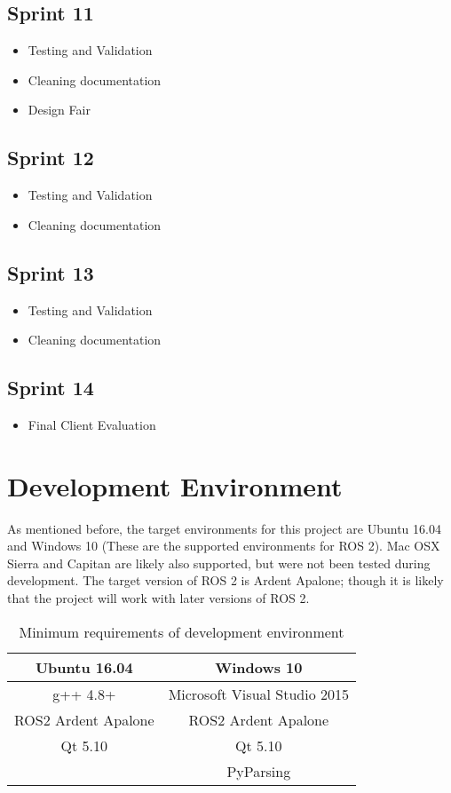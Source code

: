 \subsection{Sprint 11}
\begin{itemize}
	\item Testing and Validation
	\item Cleaning documentation
	\item Design Fair
\end{itemize}

\subsection{Sprint 12}
\begin{itemize}
	\item Testing and Validation
	\item Cleaning documentation
\end{itemize}

\subsection{Sprint 13}
\begin{itemize}
	\item Testing and Validation
	\item Cleaning documentation
\end{itemize}

\subsection{Sprint 14}
\begin{itemize}
	\item Final Client Evaluation
\end{itemize}

\section{Development Environment\label{sec:devenv}}
As mentioned before, the target environments for this project are Ubuntu 16.04 and Windows 10 (These are the supported environments for ROS 2). Mac OSX Sierra and Capitan are likely also supported, but were not been tested during development. The target version of ROS 2 is Ardent Apalone; though it is likely that the project will work with later versions of ROS 2.

\begin{table}
\centering
\begin{tabular}{c | c}
	Ubuntu 16.04 & Windows 10\\ \hline
	g++ 4.8+ & Microsoft Visual Studio 2015\\
	ROS2 Ardent Apalone & ROS2 Ardent Apalone\\
	Qt 5.10 & Qt 5.10\\
	& PyParsing\\
\end{tabular}
\caption{Minimum requirements of development environment}
\label{tab:min_reqs}
\end{table}

